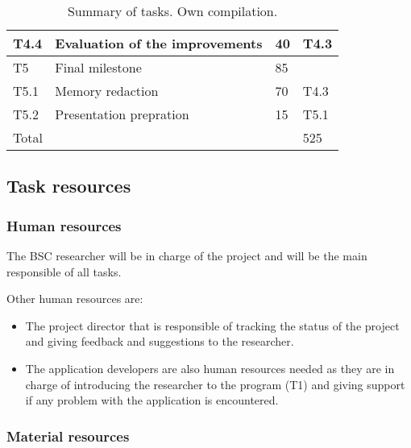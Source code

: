 \begin{table}[htbp]
\begin{tabular}{llll}
T4.4 & Evaluation of the improvements                   & 40       & T4.3         \\ \hline
T5   & Final milestone                                  & 85       &              \\ \hline
T5.1 & Memory redaction                                 & 70       & T4.3         \\
T5.2 & Presentation prepration                          & 15       & T5.1         \\ \hline
\multicolumn{3}{l}{Total}                                          & 525         
\end{tabular}
\caption[Summary of tasks]{Summary of tasks. Own compilation.}
\label{tab:tasks}
\end{table}

\subsection{Task resources}

\subsubsection{Human resources}

\justify
The BSC researcher will be in charge of the project and will be the main responsible of all tasks.

\justify
Other human resources are:
\begin{itemize}
  \item The project director that is responsible of tracking the status of the project and giving feedback and suggestions to the researcher.
  \item The application developers are also human resources needed as they are in charge of introducing the researcher to the program (T1) and giving support if any problem with the application is encountered.
\end{itemize}

\subsubsection{Material resources}

